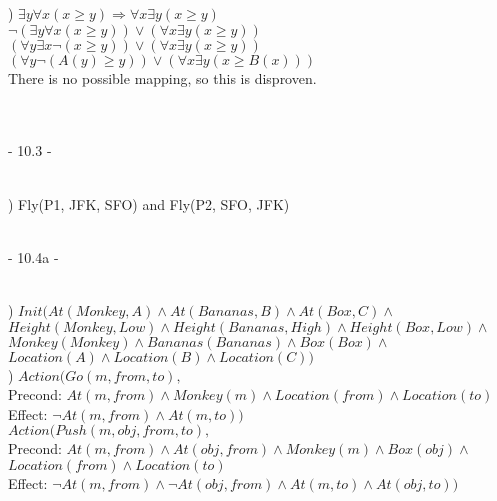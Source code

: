 \documentclass[12pt]{article}
\begin{document}
) $\exists y \forall x (x \ge y) \Rightarrow \forall x \exists y (x \ge y)$\\[.4em]
\indent $\neg(\exists y \forall x (x \ge y)) \vee (\forall x \exists y (x \ge y))$\\[.4em]
\indent $(\forall y \exists x \neg(x \ge y)) \vee (\forall x \exists y (x \ge y))$\\[.4em]
\indent $(\forall y \neg(A(y) \ge y)) \vee (\forall x \exists y (x \ge B(x)))$\\[.4em]
\indent There is no possible mapping, so this is disproven.\\



\noindent \hrulefill \\\\



\centerline{- 10.3 - }
\ \\
) Fly(P1, JFK, SFO) and Fly(P2, SFO, JFK)\\



\noindent \hrulefill \\\pagebreak



\centerline{- 10.4a - }
\ \\
) $Init( At(Monkey, A) \wedge At(Bananas, B) \wedge At(Box, C) \wedge$\\
\indent $Height(Monkey, Low) \wedge Height(Bananas, High) \wedge Height(Box, Low) \wedge$\\
\indent $Monkey(Monkey) \wedge Bananas(Bananas) \wedge Box(Box) \wedge$\\
\indent $Location(A) \wedge Location(B) \wedge Location(C))$\\

) $Action(Go(m, from, to),$\\
\indent Precond: $At(m, from) \wedge Monkey(m) \wedge Location(from) \wedge Location(to)$\\
\indent Effect: $\neg At(m, from) \wedge At(m, to) )$\\

$Action( Push(m, obj, from, to),$\\
\indent Precond: $At(m, from) \wedge At(obj, from) \wedge Monkey(m) \wedge Box(obj) \wedge $\\
\indent \indent $Location(from) \wedge Location(to)$\\
\indent Effect: $\neg At(m, from) \wedge \neg At(obj, from) \wedge At(m, to) \wedge At(obj, to) )$\\
\end{document}
